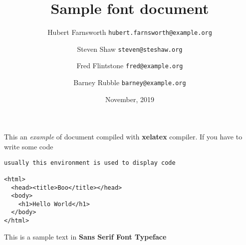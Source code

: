 \documentclass[14pt]{article}
\title{Sample font document}
\author{
  Hubert Farnsworth \texttt{hubert.farnsworth@example.org}
  \and
  Steven Shaw \texttt{steven@steshaw.org}
  \and
  Fred Flintstone \texttt{fred@example.org}
  \and
  Barney Rubble \texttt{barney@example.org}
}
\date{November, 2019}
\begin{document}
  \maketitle

   This an \textit{example} of document compiled with
   \textbf{xelatex} compiler. If you have to write
   some code

   \begin{verbatim}
usually this environment is used to display code

<html>
  <head><title>Boo</title></head>
  <body>
    <h1>Hello World</h1>
  </body>
</html>
   \end{verbatim}

  {\sffamily This is a sample text in \textbf{Sans Serif Font Typeface}}
\end{document}
